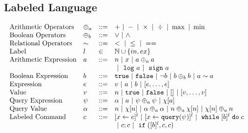 %
%
\subsection{Labeled Language}
\[
\begin{array}{llll}
\mbox{Arithmetic Operators} 
& \oplus_a & ::= & + ~|~ - ~|~ \times 
%
~|~ \div ~|~ \max ~|~ \min\\  
\mbox{Boolean Operators} 
& \oplus_b & ::= & \lor ~|~ \land
\\
%
\mbox{Relational Operators} 
& \sim & ::= & < ~|~ \leq ~|~ == 
\\  
%
\mbox{Label} 
& l & \in & \mathbb{N} \cup \{in, ex\} 
\\ 
%
\mbox{Arithmetic Expression} 
& \aexpr & ::= & 
n ~|~ {x} ~|~ \aexpr \oplus_a \aexpr  
\\
&  &  & 
 ~|~ \elog \aexpr  ~|~ \esign \aexpr
\\
%
\mbox{Boolean Expression} & \bexpr & ::= & 
%
\etrue ~|~ \efalse  ~|~ \neg \bexpr
 ~|~ \bexpr \oplus_b \bexpr
%
~|~ \aexpr \sim \aexpr 
\\
%
\mbox{Expression} & \expr & ::= & v ~|~ \aexpr ~|~ \bexpr ~|~ [\expr, \dots, \expr]
\\  
%
\mbox{Value} 
& v & ::= & { n ~|~ \etrue ~|~ \efalse ~|~ [] ~|~ [v, \dots, v]}  
\\
%
\mbox{Query Expression} 
& {\qexpr} & ::= 
& { \qval ~|~ \aexpr ~|~ \qexpr \oplus_a \qexpr ~|~ \chi[\aexpr]} 
\\
%
\mbox{Query Value} & \qval & ::= 
& {n ~|~ \chi[n] ~|~ \qval \oplus_a  \qval ~|~ n \oplus_a  \chi[n]
    ~|~ \chi[n] \oplus_a  n}
    \\
\mbox{Labeled Command} 
& {c} & ::= &   [\assign {{x}}{ {\expr}}]^{l} ~|~  [\assign {{x} } {{\query(\qexpr)}}]^{l}
~|~ {\ewhile [ \bexpr ]^{l} \edo {c} }
\\
&&&
~|~ {c};{c}  
~|~ \eif([\bexpr]{}^l , {c}, {c}) 

\end{array}\]
